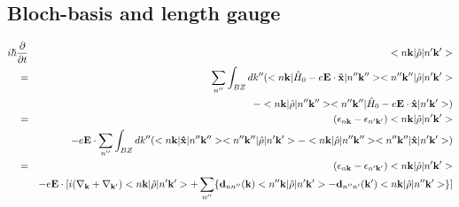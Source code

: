 \documentclass[aps,prb,preprint]{revtex4-1}
\begin{document}
\begin{appendix}
\section{Bloch-basis and length gauge}
\begin{eqnarray}\label{eq:BL} 
i \hbar \frac{ \partial }{\partial t } &&<n{\bf k}| \hat{\rho} |n'{\bf k'}> \nonumber \\
= && \sum_{n''} \int_{BZ} dk''  ( <n{\bf k}| \hat{H}_0 -e{\bf E} \cdot {\bf \hat{x}} |n''{\bf k''}><n''{\bf k''}| \hat{\rho} |n'{\bf k'}> \nonumber  \\
&&- <n{\bf k}| \hat{\rho} |n''{\bf k''}><n''{\bf k''}| \hat{H}_0 -e{\bf E} \cdot {\bf \hat{x}}  |n'{\bf k'}> )\nonumber  \\
= && (\epsilon_{n{\bf k}}-\epsilon_{n'{\bf k'}}) <n{\bf k}| \hat{\rho} |n'{\bf k'}> \nonumber  \\
&&-e{\bf E} \cdot \sum_{n''}\int_{BZ} dk'' ( <n{\bf k}| {\bf \hat{x}} |n''{\bf k''}> <n''{\bf k''}| \hat{\rho} |n'{\bf k'}> - <n{\bf k}| \hat{\rho} |n''{\bf k''}> <n''{\bf k''}| {\bf \hat{x}} |n'{\bf k'}> ) \nonumber  \\
= && (\epsilon_{n{\bf k}}-\epsilon_{n'{\bf k'}}) <n{\bf k}| \hat{\rho} |n'{\bf k'}> \nonumber  \\
&&-e{\bf E} \cdot [  i ( \nabla_{\bf k} + \nabla_{\bf k'} ) <n{\bf k}|\hat{\rho}|n'{\bf k'}> + \sum_{n''}\{ {\bf d}_{nn''}({\bf k})<n''{\bf k}|\hat{\rho}|n'{\bf k'}> - {\bf d}_{n''n'}({\bf k'})<n{\bf k}|\hat{\rho}|n''{\bf k'}> \} ] \nonumber  \\
\end{eqnarray}


\end{appendix}
\end{document}
